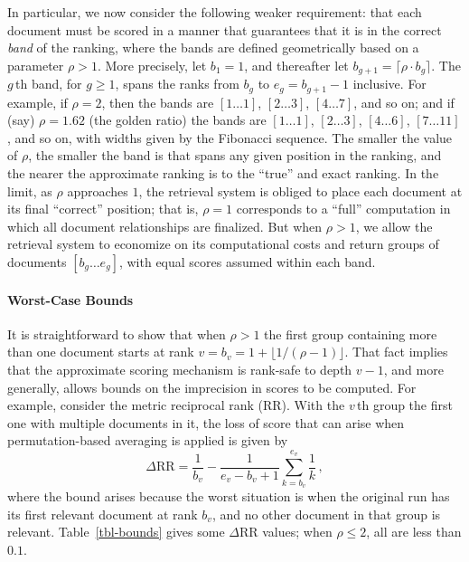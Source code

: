 \documentclass[runningheads,a4paper]{llncs}
\newcommand{\myparagraph}[1]{\vspace*{-0.7ex}\paragraph*{\normalsize\bf{#1}}}
\begin{document}
In particular, we now consider the following weaker requirement: that
each document must be scored in a manner that guarantees that it is
in the correct {\emph{band}} of the ranking, where the bands are
defined geometrically based on a parameter $\rho>1$.
More precisely, let $b_1=1$, and thereafter let
$b_{g+1}=\lceil{\rho\cdot b_g}\rceil$.
The $g$\,th band, for $g\ge1$, spans the ranks from $b_g$ to
$e_g=b_{g+1}-1$ inclusive.
For example, if $\rho=2$, then the bands are $[1\ldots1]$,
$[2\ldots3]$, $[4\ldots7]$, and so on; and if (say) $\rho=1.62$ (the
golden ratio) the bands are $[1\ldots1]$, $[2\ldots3]$, $[4\ldots6]$,
$[7\ldots11]$, and so on, with widths given by the Fibonacci
sequence.
The smaller the value of $\rho$, the smaller the band is that spans
any given position in the ranking, and the nearer the approximate
ranking is to the ``true'' and exact ranking.
In the limit, as $\rho$ approaches $1$, the retrieval system is
obliged to place each document at its final ``correct'' position; that is,
$\rho=1$ corresponds to a ``full'' computation in which all document
relationships are finalized.
But when $\rho>1$, we allow the retrieval system to economize on its
computational costs and return groups of documents $[b_g\ldots e_g]$,
with equal scores assumed within each band.

\myparagraph{Worst-Case Bounds}

It is straightforward to show that when $\rho>1$ the first group
containing more than one document starts at rank
$v=b_v=1+\lfloor{1/(\rho-1)}\rfloor$.
That fact implies that the approximate scoring mechanism is rank-safe
to depth $v-1$, and more generally, allows bounds on the imprecision
in scores to be computed.
For example, consider the metric reciprocal rank (RR).
With the $v$\,th group the first one with multiple documents in it,
the loss of score that can arise when permutation-based averaging is
applied is given by
\[
	\Delta\mbox{RR} = \frac{1}{b_v} -
		\frac{1}{e_v-b_v+1}\sum_{k=b_v}^{e_v} \frac{1}{k} \,,
\]
where the bound arises because the worst situation is when the
original run has its first relevant document at rank $b_v$, and no
other document in that group is relevant.
Table~\ref{tbl-bounds} gives some $\Delta$RR values; when $\rho\le2$,
all are less than $0.1$.
\end{document}
